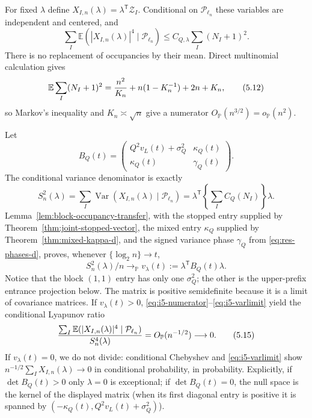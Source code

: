 \documentclass[11pt]{article}
\numberwithin{equation}{section}
\newcommand{\1}{\mathbf 1}\newcommand{\F}{\mathcal F}\newcommand{\D}{\mathcal D}
\begin{document}
For fixed $\lambda$ define
$X_{I,n}(\lambda)=\lambda^{\mathsf T}\mathcal Z_I$.  Conditional on
$\mathcal P_{\ell_n}$ these variables are independent and centered, and
\begin{equation}
 \sum_I\mathbb E(|X_{I,n}(\lambda)|^4\mid\mathcal P_{\ell_n})
 \le C_{Q,\lambda}\sum_I(N_I+1)^2.                       \tag{5.11}\label{eq:i5-numerator}
\end{equation}
There is no replacement of occupancies by their mean.  Direct multinomial
calculation gives
\begin{equation}
 \mathbb E\sum_I(N_I+1)^2={n^2\over K_n}+n(1-K_n^{-1})+2n+K_n,
                                                                    \tag{5.12}\label{eq:i5-occ2}
\end{equation}
so Markov's inequality and $K_n\asymp\sqrt n$ give a numerator
$O_{\mathbb P}(n^{3/2})=o_{\mathbb P}(n^2)$.

Let
\[
 B_Q(t)=\begin{pmatrix}
 Q^2v_L(t)+\sigma_Q^2&\kappa_Q(t)\\
 \kappa_Q(t)&\gamma_Q(t)
 \end{pmatrix}.
\]
The conditional variance denominator is exactly
\begin{equation}
 S_n^2(\lambda)=\sum_I\operatorname {Var}(X_{I,n}(\lambda)\mid\mathcal P_{\ell_n})
 =\lambda^{\mathsf T}\!\left\{\sum_IC_Q(N_I)\right\}\lambda.    \tag{5.13}\label{eq:i5-denom}
\end{equation}
Lemma~\ref{lem:block-occupancy-transfer}, with the stopped entry supplied by
Theorem~\ref{thm:joint-stopped-vector}, the mixed entry $\kappa_Q$ supplied
by Theorem~\ref{thm:mixed-kappa-d}, and the signed variance phase $\gamma_Q$
from \eqref{eq:res-phases-d}, proves, whenever
$\{\log_2n\}\to t$,
\begin{equation}S_n^2(\lambda)/n\longrightarrow_{\mathbb P}
 v_\lambda(t):=\lambda^{\mathsf T}B_Q(t)\lambda.          \tag{5.14}\label{eq:i5-varlimit}\end{equation}
Notice that the block $(1,1)$ entry has only one $\sigma_Q^2$; the other is
the upper-prefix entrance projection below.  The matrix is positive
semidefinite because it is a limit of covariance matrices.  If
$v_\lambda(t)>0$, \eqref{eq:i5-numerator}--\eqref{eq:i5-varlimit} yield the
conditional Lyapunov ratio
\begin{equation}
 {\sum_I\mathbb E(|X_{I,n}(\lambda)|^4\mid\mathcal P_{\ell_n})
  \over S_n^4(\lambda)}=O_{\mathbb P}(n^{-1/2})\longrightarrow0.  \tag{5.15}\label{eq:i5-lyap}
\end{equation}
If $v_\lambda(t)=0$, we do not divide: conditional Chebyshev and
\eqref{eq:i5-varlimit} show $n^{-1/2}\sum_IX_{I,n}(\lambda)\to0$ in
conditional probability, in probability.  Explicitly, if $\det B_Q(t)>0$
only $\lambda=0$ is exceptional; if $\det B_Q(t)=0$, the null space is the
kernel of the displayed matrix (when its first diagonal entry is positive it
is spanned by $(-\kappa_Q(t),Q^2v_L(t)+\sigma_Q^2)$).
\end{document}
